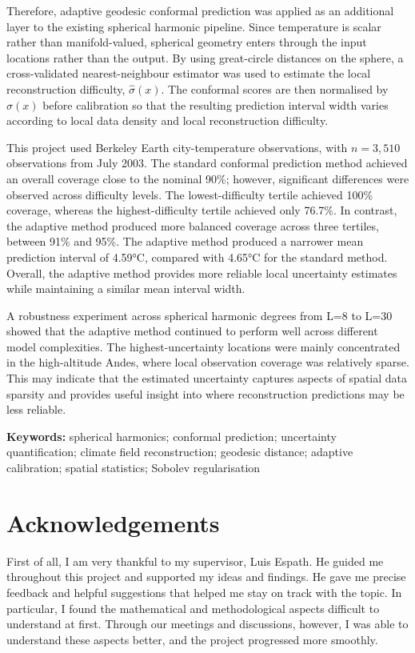 \documentclass[11pt,a4paper]{report}
\begin{document}
Therefore, adaptive geodesic conformal prediction was applied as an additional layer to the existing spherical harmonic pipeline. Since temperature is scalar rather than manifold-valued, spherical geometry enters through the input locations rather than the output. By using great-circle distances on the sphere, a cross-validated nearest-neighbour estimator was used to estimate the local reconstruction difficulty, $\hat{\sigma}(x)$. The conformal scores are then normalised by $\hat{\sigma}(x)$ before calibration so that the resulting prediction interval width varies according to local data density and local reconstruction difficulty.

This project used Berkeley Earth city-temperature observations, with $n=3,510$ observations from July 2003. The standard conformal prediction method achieved an overall coverage close to the nominal 90\%; however, significant differences were observed across difficulty levels. The lowest-difficulty tertile achieved 100\% coverage, whereas the highest-difficulty tertile achieved only 76.7\%. In contrast, the adaptive method produced more balanced coverage across three tertiles, between 91\% and 95\%. The adaptive method produced a narrower mean prediction interval of 4.59°C, compared with 4.65°C for the standard method. Overall, the adaptive method provides more reliable local uncertainty estimates while maintaining a similar mean interval width. 

A robustness experiment across spherical harmonic degrees from L=8 to L=30 showed that the adaptive method continued to perform well across different model complexities. The highest-uncertainty locations were mainly concentrated in the high-altitude Andes, where local observation coverage was relatively sparse. This may indicate that the estimated uncertainty captures aspects of spatial data sparsity and provides useful insight into where reconstruction predictions may be less reliable.

\noindent \textbf{Keywords:} spherical harmonics; conformal prediction; uncertainty quantification; climate field reconstruction; geodesic distance; adaptive calibration; spatial statistics; Sobolev regularisation

\chapter*{Acknowledgements}

First of all, I am very thankful to my supervisor, Luis Espath. He guided me throughout this project and supported my ideas and findings. He gave me precise feedback and helpful suggestions that helped me stay on track with the topic. In particular, I found the mathematical and methodological aspects difficult to understand at first. Through our meetings and discussions, however, I was able to understand these aspects better, and the project progressed more smoothly.
\end{document}
